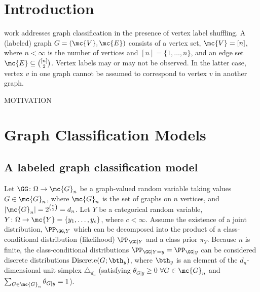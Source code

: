 \documentclass[10pt,journal,cspaper,compsoc]{IEEEtran}
\begin{document}
\maketitle
\IEEEdisplaynotcompsoctitleabstractindextext
\IEEEpeerreviewmaketitle



\section{Introduction} \label{sec:1}

 work addresses graph classification in the presence of vertex label shuffling.   
A (labeled) graph $G=(\mc{V},\mc{E})$ consists of a vertex set, $\mc{V}=[n]$, where $n < \infty$ is the number of vertices and $[n]=\{1,\ldots, n\}$, and an edge set $\mc{E} \subseteq \binom{[n]}{2}$.  Vertex labels may or may not be observed.  In the latter case, vertex $v$ in one graph cannot be assumed to correspond to vertex $v$ in another graph.

MOTIVATION




\section{Graph Classification Models} %
\label{sec:shuffler_graph_class_models}

\subsection{A labeled graph classification model} %
\label{sub:a_labeled_graph_classification_model}


 Let $\GG\colon \Omega \to \mc{G}_n$ be a graph-valued random variable taking values $G\in \mc{G}_n$, where $\mc{G}_n$ is the set of graphs on $n$ vertices, and $|\mc{G}_n|=2^{\binom{n}{2}}=d_n$. 
Let $Y$ be a categorical random variable, $Y\colon \Omega \to \mc{Y}=\{y_1,\ldots, y_{c}\}$, where $c< \infty$.  Assume the existence of a joint distribution, $\PP_{\GG,Y}$ which can be decomposed into the product of a class-conditional distribution (likelihood) $\PP_{\GG|Y}$ and a class prior $\pi_Y$. Because $n$ is finite, the class-conditional  distributions $\PP_{\GG | Y=y}=\PP_{\GG|y}$ can be considered discrete distributions $\text{Discrete}(G; \bth_y)$, where $\bth_y$ is an element of the $d_n$-dimensional unit simplex $\triangle_{d_n}$ (satisfying $\theta_{G|y}\geq 0$ $\forall G \in \mc{G}_n$ and $\sum_{G \in \mc{G}_n} \theta_{G|y}=1$).
\end{document}
